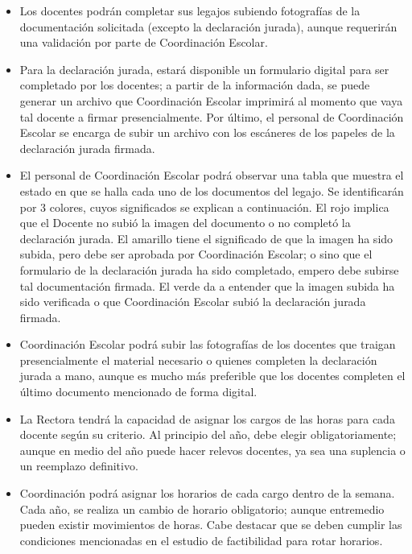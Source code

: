 \begin{itemize}
  \item Los docentes podrán completar sus legajos subiendo
  fotografías de la documentación solicitada (excepto la declaración
  jurada), aunque requerirán una validación por parte de Coordinación
  Escolar.
  \item Para la declaración jurada, estará disponible un formulario
  digital para ser completado por los docentes; a partir de la
  información dada, se puede generar un archivo que Coordinación
  Escolar imprimirá al momento que vaya tal docente a firmar
  presencialmente. Por último, el personal de Coordinación Escolar
  se encarga de subir un archivo con los escáneres de los papeles de
  la declaración jurada firmada.
  \item El personal de Coordinación Escolar podrá observar una tabla
  que muestra el estado en que se halla cada uno de los documentos
  del legajo. Se identificarán por 3 colores, cuyos significados se
  explican a continuación. El rojo implica que el Docente no subió la
  imagen del documento o no completó la declaración jurada. El
  amarillo tiene el significado de que la imagen ha sido subida, pero
  debe ser aprobada por Coordinación Escolar; o sino que el formulario
  de la declaración jurada ha sido completado, empero debe subirse tal
  documentación firmada. El verde da a entender que la imagen subida
  ha sido verificada o que Coordinación Escolar subió la declaración
  jurada firmada.
  \item Coordinación Escolar podrá subir las fotografías de los
  docentes que traigan presencialmente el material necesario o quienes
  completen la declaración jurada a mano, aunque es mucho más
  preferible que los docentes completen el último documento mencionado
  de forma digital.
  \item La Rectora tendrá la capacidad de asignar los cargos de las
  horas para cada docente según su criterio. Al principio del año,
  debe elegir obligatoriamente; aunque en medio del año puede hacer
  relevos docentes, ya sea una suplencia o un reemplazo definitivo.
  \item Coordinación podrá asignar los horarios de cada cargo dentro
  de la semana. Cada año, se realiza un cambio de horario obligatorio;
  aunque entremedio pueden existir movimientos de horas. Cabe destacar
  que se deben cumplir las condiciones mencionadas en el estudio de
  factibilidad para rotar horarios.
\end{itemize}
